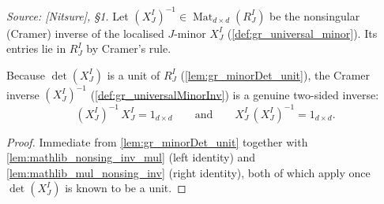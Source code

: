 \begin{definition}

  \label{def:gr_universalMinorInv}
  \textit{Source: [Nitsure], \S 1.}
  Let \((X^I_J)^{-1} \in \operatorname{Mat}_{d \times d}(R^I_J)\) be the
  nonsingular (Cramer) inverse of the localised \(J\)-minor \(X^I_J\)
  (\cref{def:gr_universal_minor}). Its entries lie in \(R^I_J\) by Cramer's rule.
\end{definition}

\begin{lemma}

  \label{lem:gr_universalMinorInv_identities}
  Because \(\det(X^I_J)\) is a unit of \(R^I_J\) (\cref{lem:gr_minorDet_unit}),
  the Cramer inverse \((X^I_J)^{-1}\) (\cref{def:gr_universalMinorInv}) is a
  genuine two-sided inverse:
  \[
    (X^I_J)^{-1}\, X^I_J = 1_{d\times d}
    \qquad\text{and}\qquad
    X^I_J\, (X^I_J)^{-1} = 1_{d\times d}.
  \]
\end{lemma}
\begin{proof}
  \leanok
  Immediate from \cref{lem:gr_minorDet_unit} together with
  \cref{lem:mathlib_nonsing_inv_mul} (left identity) and
  \cref{lem:mathlib_mul_nonsing_inv} (right identity), both of which apply once
  \(\det(X^I_J)\) is known to be a unit.
\end{proof}

